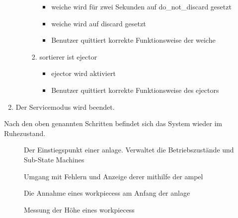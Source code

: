 \begin{enumerate}
\begin{enumerate}
\begin{enumerate}
            \begin{itemize}
                \item \gls{weiche} wird für zwei Sekunden auf \gls{do_not_discard} gesetzt
                \item \gls{weiche} wird auf \gls{discard} gesetzt
                \item Benutzer quittiert korrekte Funktionsweise der \gls{weiche}
            \end{itemize}
            \item \gls{sortierer} ist \gls{ejector}
            \begin{itemize}
                \item \Gls{ejector} wird aktiviert
                \item Benutzer quittiert korrekte Funktionsweise des \gls{ejector}s
            \end{itemize}
        \end{enumerate}
    \end{enumerate}
    \item Der Servicemodus wird beendet.
\end{enumerate}
Nach den oben genannten Schritten befindet sich das System wieder im Ruhezustand.


\begin{figure}
    \caption{Der Einstiegspunkt einer \gls{anlage}.
    Verwaltet die Betriebszustände und Sub-State Machines}
    \label{fig:stm_top_level}
\end{figure}

\begin{figure}
    \caption{Umgang mit Fehlern und Anzeige derer mithilfe der \gls{ampel}}
    \label{fig:stm_error}
\end{figure}

\begin{figure}
    \caption{Die Annahme eines \glspl{workpiece}s am Anfang der \gls{anlage}}
    \label{fig:stm_werkstueck_annahme}
\end{figure}

\begin{figure}
    \caption{Messung der Höhe eines \glspl{workpiece}s}
    \label{fig:stm_hoehe_messen}
\end{figure}

